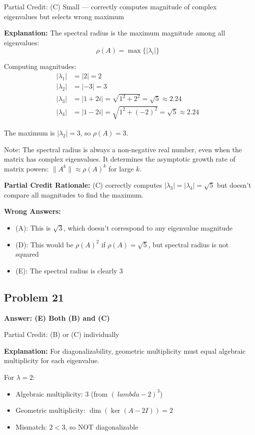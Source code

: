 \documentclass[12pt]{amsart}
\newcommand{\correct}[1]{{\color{correctgreen}\textbf{#1}}}
\newcommand{\partcred}[1]{{\color{partialblue}#1}}
\begin{document}
\partcred{Partial Credit: (C) Small — correctly computes magnitude of complex eigenvalues but selects wrong maximum}

\textbf{Explanation:} The spectral radius is the maximum magnitude among all eigenvalues:
$$\rho(A) = \max\{|\lambda_i|\}$$

Computing magnitudes:
\begin{align*}
|\lambda_1| &= |2| = 2\\
|\lambda_2| &= |-3| = 3\\
|\lambda_3| &= |1+2i| = \sqrt{1^2 + 2^2} = \sqrt{5} \approx 2.24\\
|\lambda_4| &= |1-2i| = \sqrt{1^2 + (-2)^2} = \sqrt{5} \approx 2.24
\end{align*}

The maximum is $|\lambda_2| = 3$, so $\rho(A) = 3$.

Note: The spectral radius is always a non-negative real number, even when the matrix has complex eigenvalues. It determines the asymptotic growth rate of matrix powers: $\|A^k\| \approx \rho(A)^k$ for large $k$.

\textbf{Partial Credit Rationale:} (C) correctly computes $|\lambda_3| = |\lambda_4| = \sqrt{5}$ but doesn't compare all magnitudes to find the maximum.

\textbf{Wrong Answers:}
\begin{itemize}
\item (A): This is $\sqrt{3}$, which doesn't correspond to any eigenvalue magnitude
\item (D): This would be $\rho(A)^2$ if $\rho(A) = \sqrt{5}$, but spectral radius is not squared
\item (E): The spectral radius is clearly 3
\end{itemize}

\subsection*{Problem 21}
\correct{Answer: (E) Both (B) and (C)}

\partcred{Partial Credit: (B) or (C) individually}

\textbf{Explanation:} For diagonalizability, geometric multiplicity must equal algebraic multiplicity for each eigenvalue.

For $\lambda = 2$:
\begin{itemize}
\item Algebraic multiplicity: 3 (from $(\ lambda - 2)^3$)
\item Geometric multiplicity: $\dim(\ker(A - 2I)) = 2$
\item Mismatch: $2 < 3$, so NOT diagonalizable
\end{itemize}
\end{document}
